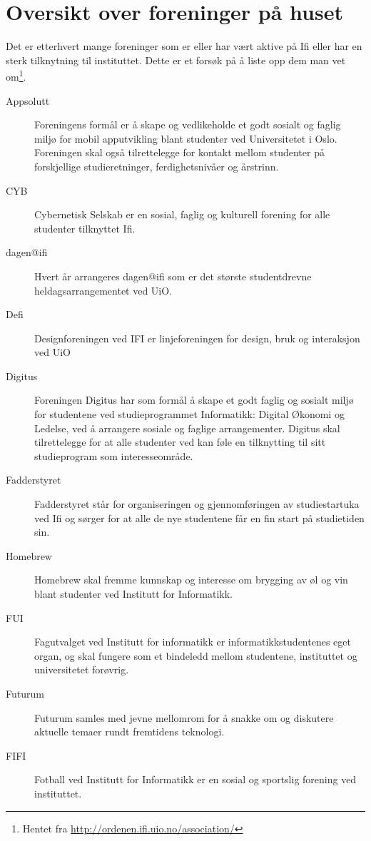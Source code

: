 \chapter*{Oversikt over foreninger på huset}

Det er etterhvert mange foreninger som er eller har vært aktive på Ifi eller har en sterk tilknytning til instituttet. Dette er et forsøk på å liste opp dem man vet om\footnote{Hentet fra \url{http://ordenen.ifi.uio.no/association/}}.

\begin{description}
	\item[Appsolutt] Foreningens formål er å skape og vedlikeholde et godt sosialt og faglig miljø for mobil apputvikling blant studenter ved Universitetet i Oslo. Foreningen skal også tilrettelegge for kontakt mellom studenter på forskjellige studieretninger, ferdighetsnivåer og årstrinn.
	\item[CYB] Cybernetisk Selskab er en sosial, faglig og kulturell forening for alle studenter tilknyttet Ifi.
	\item[dagen@ifi] Hvert år arrangeres dagen@ifi som er det største studentdrevne heldagsarrangementet ved UiO.
	\item[Defi] Designforeningen ved IFI er linjeforeningen for design, bruk og interaksjon ved UiO
	\item[Digitus] Foreningen Digitus har som formål å skape et godt faglig og sosialt miljø for studentene ved studieprogrammet Informatikk: Digital Økonomi og Ledelse, ved å arrangere sosiale og faglige arrangementer. Digitus skal tilrettelegge for at alle studenter ved kan føle en tilknytting til sitt studieprogram som interesseområde.
	\item[Fadderstyret] Fadderstyret står for organiseringen og gjennomføringen av studiestartuka ved Ifi og sørger for at alle de nye studentene får en fin start på studietiden sin.
	\item[Homebrew] Homebrew skal fremme kunnskap og interesse om brygging av øl og vin blant studenter ved Institutt for Informatikk.
	\item[FUI] Fagutvalget ved Institutt for informatikk er informatikkstudentenes eget organ, og skal fungere som et bindeledd mellom studentene, instituttet og universitetet forøvrig.
	\item[Futurum] Futurum samles med jevne mellomrom for å snakke om og diskutere aktuelle temaer rundt fremtidens teknologi.
	\item[FIFI] Fotball ved Institutt for Informatikk er en sosial og sportslig forening ved instituttet.

\end{description}
